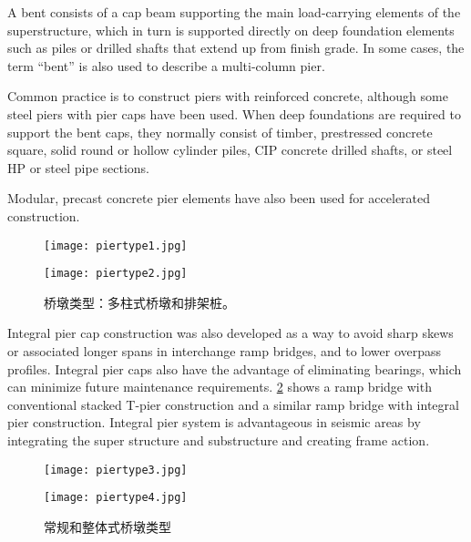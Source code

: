 A bent consists of a cap beam supporting the main load-carrying elements of the superstructure, which in turn is supported directly on deep foundation elements such as piles or drilled shafts that extend up from finish grade. In some cases, the term “bent” is also used to describe a multi-column pier.

Common practice is to construct piers with reinforced concrete, although some steel piers with pier caps have been used. When deep foundations are required to support the bent caps, they normally consist of timber, prestressed concrete square, solid round or hollow cylinder piles, CIP concrete drilled shafts, or steel HP or steel pipe sections.

Modular, precast concrete pier elements have also been used for accelerated construction.

\begin{figure}
  \begin{minipage}{0.48\linewidth}\centering
    \texttt{[image: piertype1.jpg]}
  \end{minipage}\hfil
  \begin{minipage}{0.48\linewidth}\centering
    \texttt{[image: piertype2.jpg]}
  \end{minipage}
  \caption{桥墩类型：多柱式桥墩和排架桩。}
  \label{fig:piertypes-multi}
\end{figure}

Integral pier cap construction was also developed as a way to avoid sharp skews or associated longer spans in interchange ramp bridges, and to lower overpass profiles. Integral pier caps also have the advantage of eliminating bearings, which can minimize future maintenance requirements. \cref{fig:piertypes-integral} shows a ramp bridge with conventional stacked T-pier construction and a similar ramp bridge with integral pier construction. Integral pier system is advantageous in seismic areas by integrating the super structure and substructure and creating frame action.

\begin{figure}
  \begin{minipage}{0.48\linewidth}\centering
    \texttt{[image: piertype3.jpg]}
  \end{minipage}\hfil
  \begin{minipage}{0.48\linewidth}\centering
    \texttt{[image: piertype4.jpg]}
  \end{minipage}
  \caption{常规和整体式桥墩类型}
  \label{fig:piertypes-integral}
\end{figure}

